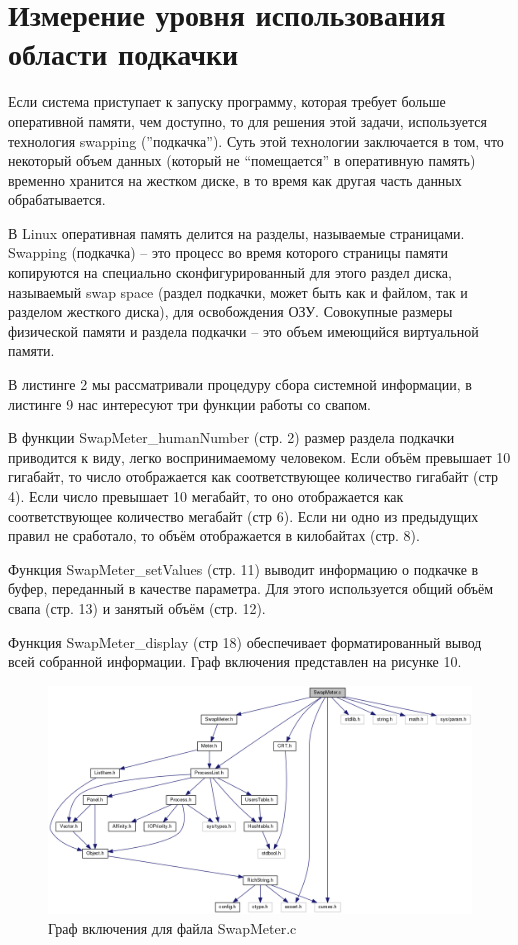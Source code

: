 \documentclass[a4paper, 12pt]{article}		%
\begin{document}
\section{Измерение уровня использования области подкачки}

Если система приступает к запуску программу, которая требует больше оперативной памяти, чем доступно, то для решения этой задачи, используется технология swapping (”подкачка”). Суть этой технологии заключается в том, что некоторый объем данных (который не “помещается” в оперативную память) временно хранится на жестком диске, в то время как другая часть данных обрабатывается.

В Linux оперативная память делится на разделы, называемые страницами. Swapping (подкачка) – это процесс во время которого страницы памяти копируются на специально сконфигурированный для этого раздел диска, называемый swap space (раздел подкачки, может быть как и файлом, так и разделом жесткого диска), для освобождения ОЗУ. Совокупные размеры физической памяти и раздела подкачки – это объем имеющийся виртуальной памяти.

В листинге 2 мы рассматривали процедуру сбора системной информации, в листинге 9 нас интересуют три функции работы со свапом.

В функции SwapMeter\_humanNumber (стр. 2) размер раздела подкачки приводится к виду, легко воспринимаемому человеком. Если объём превышает 10 гигабайт, то число отображается как соответствующее количество гигабайт (стр 4). Если число превышает 10 мегабайт, то оно отображается как соответствующее количество мегабайт (стр 6). Если ни одно из предыдущих правил не сработало, то объём отображается в килобайтах (стр. 8).

Функция SwapMeter\_setValues (стр. 11) выводит информацию о подкачке в буфер, переданный в качестве параметра. Для этого используется общий объём свапа (стр. 13) и занятый объём (стр. 12).

Функция SwapMeter\_display (стр 18) обеспечивает форматированный вывод всей собранной информации. Граф включения представлен на рисунке 10.



\begin{figure}[h!]
\centering
\includegraphics[scale=0.43]{res/swap_meter.png}
\caption{Граф включения для файла SwapMeter.c}
\end{figure}
\end{document}
